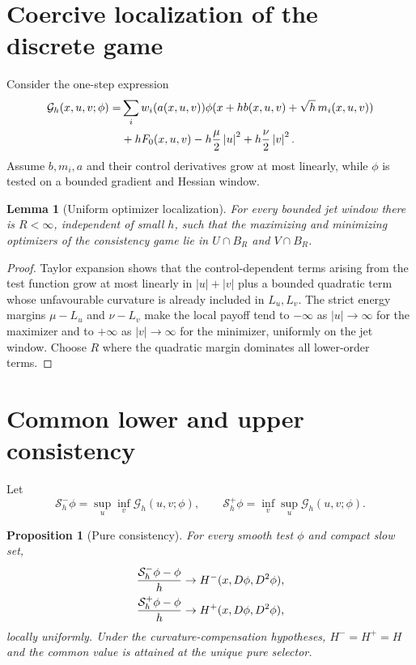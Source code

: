 \documentclass[11pt,reqno]{amsart}
\newtheorem{lemma}[theorem]{Lemma}
\newtheorem{proposition}[theorem]{Proposition}
\theoremstyle{definition}
\newcommand{\abs}[1]{\left\lvert#1\right\rvert}
\begin{document}
\section{Coercive localization of the discrete game}

Consider the one-step expression
\begin{align*}
 \mathcal G_h(x,u,v;\phi)
 =&\sum_iw_i(a(x,u,v))
 \phi(x+hb(x,u,v)+\sqrt h\,m_i(x,u,v))\\
 &+hF_0(x,u,v)-h{\mu\over2}\abs u^2+h{\nu\over2}\abs v^2.
\end{align*}
Assume $b,m_i,a$ and their control derivatives grow at most linearly, while
$\phi$ is tested on a bounded gradient and Hessian window.

\begin{lemma}[Uniform optimizer localization]\label{lem:localization}
For every bounded jet window there is $R<\infty$, independent of small $h$,
such that the maximizing and minimizing optimizers of the consistency game lie
in $U\cap B_R$ and $V\cap B_R$.
\end{lemma}

\begin{proof}
Taylor expansion shows that the control-dependent terms arising from the test
function grow at most linearly in $\abs u+\abs v$ plus a bounded quadratic term
whose unfavourable curvature is already included in $L_u,L_v$.  The strict
energy margins $\mu-L_u$ and $\nu-L_v$ make the local payoff tend to
$-\infty$ as $\abs u\to\infty$ for the maximizer and to $+\infty$ as
$\abs v\to\infty$ for the minimizer, uniformly on the jet window.  Choose $R$
where the quadratic margin dominates all lower-order terms.
\end{proof}

\section{Common lower and upper consistency}

Let
\[
 \mathcal S_h^-\phi=\sup_u\inf_v\mathcal G_h(u,v;\phi),
 \qquad
 \mathcal S_h^+\phi=\inf_v\sup_u\mathcal G_h(u,v;\phi).
\]

\begin{proposition}[Pure consistency]\label{prop:pure-consistency}
For every smooth test $\phi$ and compact slow set,
\begin{align*}
 {\mathcal S_h^-\phi-\phi\over h}&\to H^-(x,D\phi,D^2\phi),\\
 {\mathcal S_h^+\phi-\phi\over h}&\to H^+(x,D\phi,D^2\phi),
\end{align*}
locally uniformly.  Under the curvature-compensation hypotheses,
$H^-=H^+=H$ and the common value is attained at the unique pure selector.
\end{proposition}
\end{document}

